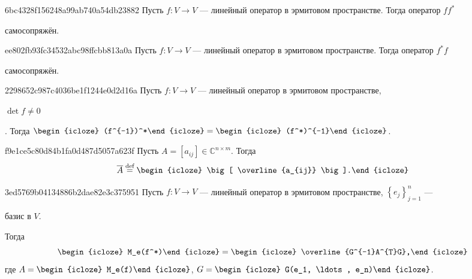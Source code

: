 \begin{note}{6bc4328f156248a99ab740a54db23882}
    Пусть \({ f : V \to V }\) --- линейный оператор в эрмитовом пространстве.
    Тогда оператор \({ ff^* }\) \begin{icloze}{1}самосопряжён.\end{icloze}
\end{note}

\begin{note}{ee802fb93fc34532abc98ffcbb813a0a}
    Пусть \({ f : V \to V }\) --- линейный оператор в эрмитовом пространстве.
    Тогда оператор \({ f^*f }\) \begin{icloze}{1}самосопряжён.\end{icloze}
\end{note}

\begin{note}{2298652c987c4036be1f1244e0d2d16a}
    Пусть \({ f : V \to V }\) --- линейный оператор в эрмитовом пространстве,\: \begin{icloze}{3}\({ \det f \neq 0 }\)\end{icloze}.
    Тогда \({ \begin{icloze}{2}(f^{-1})^*\end{icloze} = \begin{icloze}{1}(f^*)^{-1}\end{icloze} }\).
\end{note}

\begin{note}{f9e1ce5c80d84b1fa0d487d5057a623f}
    Пусть \({ A = [a_{ij}] \in \mathbb C^{n \times m} }\).
    Тогда
    \[
        \overline{A} \overset{\text{def}}= \begin{icloze}{1}\big[ \overline{a_{ij}} \big].\end{icloze}
    \]
\end{note}

\begin{note}{3ed5769b04134886b2dae82e3c375951}
    Пусть \({ f : V \to V }\) --- линейный оператор в эрмитовом пространстве,\: \({ \left\{ e_j \right\}_{j = 1}^{n} }\) --- \begin{icloze}{4}базис в \({ V }\).\end{icloze}
    Тогда
    \[
        \begin{icloze}{5}M_e(f^*)\end{icloze} = \begin{icloze}{1}\overline{G^{-1}A^{T}G},\end{icloze}
    \]
    где \({ A = \begin{icloze}{2}M_e(f)\end{icloze} }\),\: \({ G = \begin{icloze}{3}G(e_1, \ldots, e_n)\end{icloze} }\).
\end{note}

